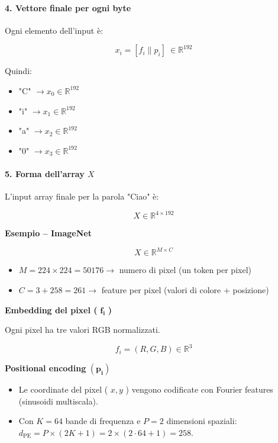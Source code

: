 \documentclass[
  11pt,
]{article}
\begin{document}
\paragraph{4. \textbf{Vettore finale per ogni byte}}

Ogni elemento dell'input è:

\[x_{i} = \left\lbrack f_{i}\| p_{i} \right\rbrack\  \in \mathbb{R}^{192}\]

Quindi:

\begin{itemize}
\item
  "C" \(\rightarrow x_{0} \in \mathbb{R}^{192}\)
\item
  "i" \(\rightarrow x_{1} \in \mathbb{R}^{192}\)
\item
  "a" \(\rightarrow x_{2} \in \mathbb{R}^{192}\)
\item
  "0" \(\rightarrow x_{3} \in \mathbb{R}^{192}\)
\end{itemize}

\paragraph{5. Forma dell'array $X$}

L'input array finale per la parola "Ciao" è:

\[X \in \mathbb{R}^{4 \times 192}\]

\textbf{Esempio -- ImageNet}

\[X \in \mathbb{R}^{M \times C}\]

\begin{itemize}
\item
  \(M = 224 \times 224 = 50176 \rightarrow\) numero di pixel (un token
  per pixel)
\item
  \(C = 3 + 258 = 261 \rightarrow\) feature per pixel (valori di colore
  + posizione)
\end{itemize}

\textbf{Embedding del pixel (} \(\mathbf{f}_{\mathbf{i}}\) \textbf{)}

Ogni pixel ha tre valori RGB normalizzati.

\[f_{i} = (R,G,B) \in \mathbb{R}^{3}\]

\textbf{Positional encoding} \(\left( \mathbf{p}_{\mathbf{i}} \right)\)

\begin{itemize}
\item
  Le coordinate del pixel ( \(x,y\) ) vengono codificate con Fourier
  features (sinusoidi multiscala).
\item
  Con \(K=64\) bande di frequenza e \(P=2\) dimensioni spaziali: \(d_{\text{PE}} = P \times (2K+1) = 2 \times (2 \cdot 64 + 1) = 258\).
\end{itemize}
\end{document}
